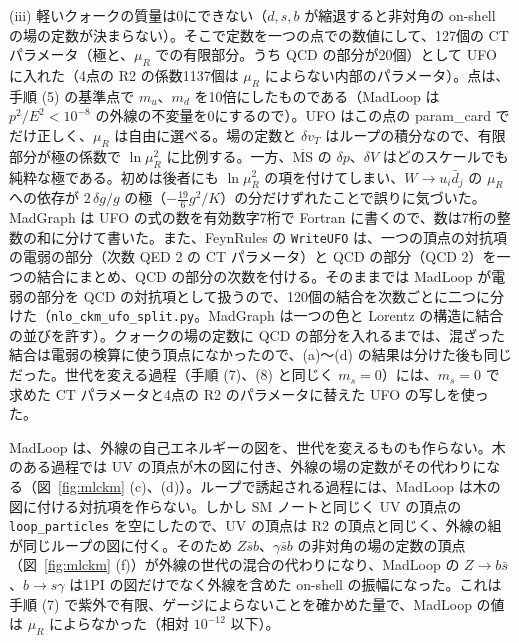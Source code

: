 \documentclass[a4paper,10pt]{ltjsarticle}
\newcommand{\MSbar}{\overline{\mathrm{MS}}}
\begin{document}
(iii) 軽いクォークの質量は0にできない（$d,s,b$ が縮退すると非対角の on-shell の場の定数が決まらない）。そこで定数を一つの点での数値にして、127個の CT パラメータ（極と、$\mu_R$ での有限部分。うち QCD の部分が20個）として UFO に入れた（4点の R2 の係数1137個は $\mu_R$ によらない内部のパラメータ）。点は、手順 (5) の基準点で $m_u$、$m_d$ を10倍にしたものである（MadLoop は $p^2/E^2<10^{-8}$ の外線の不変量を0にするので）。UFO はこの点の param\_card でだけ正しく、$\mu_R$ は自由に選べる。場の定数と $\delta v_T$ はループの積分なので、有限部分が極の係数で $\ln\mu_R^2$ に比例する。一方、$\MSbar$ の $\delta p$、$\delta V$ はどのスケールでも純粋な極である。初めは後者にも $\ln\mu_R^2$ の項を付けてしまい、$W\to u_i\bar d_j$ の $\mu_R$ への依存が $2\,\delta g/g$ の極（$-\frac{19}{6}g^2/K$）の分だけずれたことで誤りに気づいた。MadGraph は UFO の式の数を有効数字7桁で Fortran に書くので、数は7桁の整数の和に分けて書いた。また、FeynRules の \texttt{WriteUFO} は、一つの頂点の対抗項の電弱の部分（次数 QED 2 の CT パラメータ）と QCD の部分（QCD 2）を一つの結合にまとめ、QCD の部分の次数を付ける。そのままでは MadLoop が電弱の部分を QCD の対抗項として扱うので、120個の結合を次数ごとに二つに分けた（\texttt{nlo\_ckm\_ufo\_split.py}。MadGraph は一つの色と Lorentz の構造に結合の並びを許す）。クォークの場の定数に QCD の部分を入れるまでは、混ざった結合は電弱の検算に使う頂点になかったので、(a)〜(d) の結果は分けた後も同じだった。世代を変える過程（手順 (7)、(8) と同じく $m_s=0$）には、$m_s=0$ で求めた CT パラメータと4点の R2 のパラメータに替えた UFO の写しを使った。

MadLoop は、外線の自己エネルギーの図を、世代を変えるものも作らない。木のある過程では UV の頂点が木の図に付き、外線の場の定数がその代わりになる（図~\ref{fig:mlckm} (c)、(d)）。ループで誘起される過程には、MadLoop は木の図に付ける対抗項を作らない。しかし SM ノートと同じく UV の頂点の \texttt{loop\_particles} を空にしたので、UV の頂点は R2 の頂点と同じく、外線の組が同じループの図に付く。そのため $Z\bar sb$、$\gamma\bar sb$ の非対角の場の定数の頂点（図~\ref{fig:mlckm} (f)）が外線の世代の混合の代わりになり、MadLoop の $Z\to b\bar s$、$b\to s\gamma$ は1PI の図だけでなく外線を含めた on-shell の振幅になった。これは手順 (7) で紫外で有限、ゲージによらないことを確かめた量で、MadLoop の値は $\mu_R$ によらなかった（相対 $10^{-12}$ 以下）。
\end{document}
